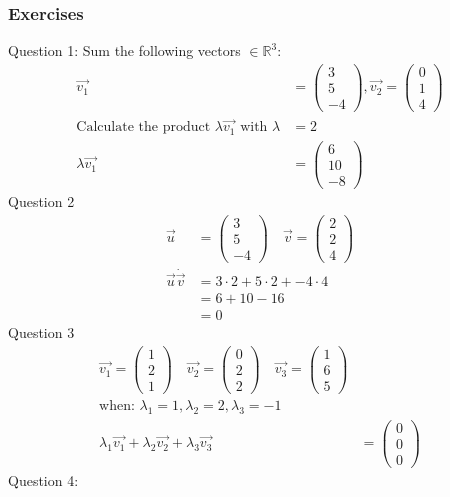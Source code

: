 \documentclass{article}
\begin{document}
\subsubsection{Exercises}
Question 1:
Sum the following vectors $\in \mathbb{R}^3$:
\begin{align*}
    \vec{v_1} &= \begin{pmatrix} 3 \\ 5 \\ -4 \end{pmatrix}, \vec{v_2} = \begin{pmatrix} 0 \\ 1 \\ 4 \end{pmatrix} \\
    \textrm{Calculate the product } \lambda \vec{v_1} \textrm{ with } \lambda &= 2 \\
    \lambda \vec{v_1} &= \begin{pmatrix} 6 \\ 10 \\ -8 \end{pmatrix}
\end{align*}
Question 2
\begin{align*}
    \vec{u} &= \begin{pmatrix} 3 \\ 5 \\ -4 \end{pmatrix} \quad \vec{v} = \begin{pmatrix} 2 \\ 2 \\ 4 \end{pmatrix} \\
    \vec{u} \dot \vec{v} &= 3 \cdot 2 + 5 \cdot 2 + -4 \cdot 4 \\
    &= 6 + 10 - 16 \\
    &= 0
\end{align*}
Question 3
\begin{align}
    \vec{v_1} = \begin{pmatrix} 1 \\ 2 \\ 1 \end{pmatrix} \quad \vec{v_2} = \begin{pmatrix} 0 \\ 2 \\ 2 \end{pmatrix} \quad \vec{v_3} = \begin{pmatrix} 1 \\ 6 \\ 5 \end{pmatrix} \\
    \textrm{when: } \lambda_1 = 1, \lambda_2 = 2, \lambda_3 = -1 \\
    \lambda_1 \vec{v_1} + \lambda_2 \vec{v_2} + \lambda_3 \vec{v_3} &= \begin{pmatrix} 0 \\ 0 \\ 0 \end{pmatrix}
\end{align}
Question 4:
\end{document}

